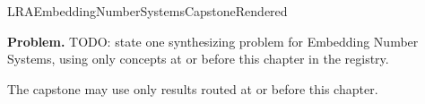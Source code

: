 \ifcsname LRAEmbeddingNumberSystemsCapstoneRendered\endcsname
\else
\expandafter\gdef\csname LRAEmbeddingNumberSystemsCapstoneRendered\endcsname{}

\newpage
{}
\label{cap:embedding-number-systems}

\begin{tcolorbox}[
  colback=gray!6,
  colframe=gray!40,
  arc=2pt,
  left=8pt, right=8pt, top=6pt, bottom=6pt,
  title={\small\textbf{Capstone Problem}},
  fonttitle=\small\bfseries
]
\textbf{Problem.}
TODO: state one synthesizing problem for Embedding Number Systems, using only concepts at or
before this chapter in the registry.
\end{tcolorbox}

\begin{remark*}
The capstone may use only results routed at or before this chapter.
\end{remark*}

\clearpage
\fi
